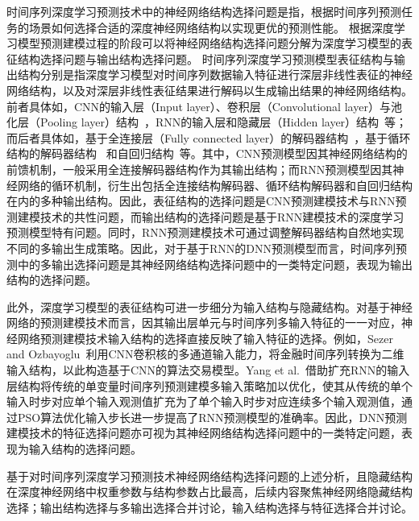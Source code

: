 时间序列深度学习预测技术中的神经网络结构选择问题是指，根据时间序列预测任务的场景如何选择合适的深度神经网络结构以实现更优的预测性能。
根据深度学习模型预测建模过程的阶段可以将神经网络结构选择问题分解为深度学习模型的表征结构选择问题与输出结构选择问题。
时间序列深度学习预测模型表征结构与输出结构分别是指深度学习模型对时间序列数据输入特征进行深层非线性表征的神经网络结构，以及对深层非线性表征结果进行解码以生成输出结果的神经网络结构。
前者具体如，CNN的输入层（Input layer）、卷积层（Convolutional layer）与池化层（Pooling layer）结构~\cite{koprinskaConvolutional2018}，RNN的输入层和隐藏层（Hidden layer）结构~\cite{salinasDeepAR2020}等；而后者具体如，基于全连接层（Fully connected layer）的解码器结构~\cite{koprinskaConvolutional2018,caiDayahead2019}，基于循环结构的解码器结构~\cite{liuDSTPRNN2020}
和自回归结构~\cite{caiDayahead2019,salinasDeepAR2020}等。其中，CNN预测模型因其神经网络结构的前馈机制，一般采用全连接解码器结构作为其输出结构；而RNN预测模型因其神经网络的循环机制，衍生出包括全连接结构解码器、循环结构解码器和自回归结构在内的多种输出结构。因此，表征结构的选择问题是CNN预测建模技术与RNN预测建模技术的共性问题，而输出结构的选择问题是基于RNN建模技术的深度学习预测模型特有问题。同时，RNN预测建模技术可通过调整解码器结构自然地实现不同的多输出生成策略。因此，对于基于RNN的DNN预测模型而言，时间序列预测中的多输出选择问题是其神经网络结构选择问题中的一类特定问题，表现为输出结构的选择问题。

此外，深度学习模型的表征结构可进一步细分为输入结构与隐藏结构。对基于神经网络的预测建模技术而言，因其输出层单元与时间序列多输入特征的一一对应，神经网络预测建模技术输入结构的选择直接反映了输入特征的选择。例如，Sezer and Ozbayoglu~\cite{sezer2018algorithmic}利用CNN卷积核的多通道输入能力，将金融时间序列转换为二维输入结构，以此构造基于CNN的算法交易模型。Yang et al.~\cite{yangShortterm2021}借助扩充RNN的输入层结构将传统的单变量时间序列预测建模多输入策略加以优化，使其从传统的单个输入时步对应单个输入观测值扩充为了单个输入时步对应连续多个输入观测值，通过PSO算法优化输入步长进一步提高了RNN预测模型的准确率。因此，DNN预测建模技术的特征选择问题亦可视为其神经网络结构选择问题中的一类特定问题，表现为输入结构的选择问题。

基于对时间序列深度学习预测技术神经网络结构选择问题的上述分析，且隐藏结构在深度神经网络中权重参数与结构参数占比最高，后续内容聚焦神经网络隐藏结构选择；输出结构选择与多输出选择合并讨论，输入结构选择与特征选择合并讨论。

